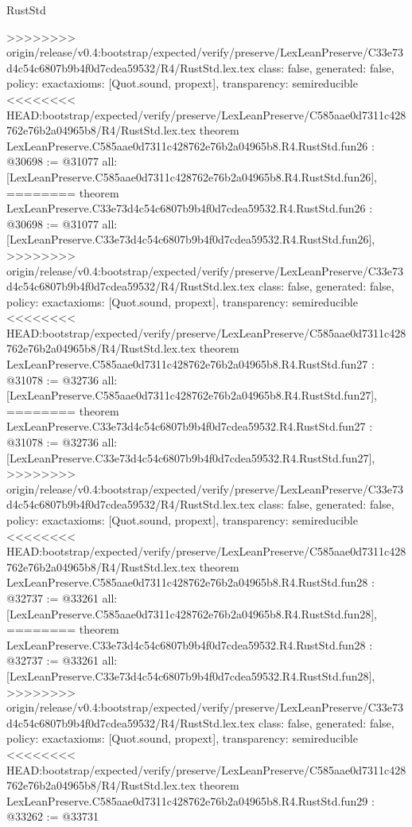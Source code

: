\begin{lexlean}{RustStd}
\begin{coremodule}
{\begin{coremodule}
{{{{{{{{{{{{{{{{{{{{{{{{{{{{{>>>>>>>> origin/release/v0.4:bootstrap/expected/verify/preserve/LexLeanPreserve/C33e73d4c54c6807b9b4f0d7cdea59532/R4/RustStd.lex.tex
  class: false,
  generated: false,
  policy: exact{axioms: [Quot.sound, propext]},
  transparency: semireducible
}
<<<<<<<< HEAD:bootstrap/expected/verify/preserve/LexLeanPreserve/C585aae0d7311c428762e76b2a04965b8/R4/RustStd.lex.tex
theorem LexLeanPreserve.C585aae0d7311c428762e76b2a04965b8.R4.RustStd.fun26 : @30698 := @31077 {
  all: [LexLeanPreserve.C585aae0d7311c428762e76b2a04965b8.R4.RustStd.fun26],
========
theorem LexLeanPreserve.C33e73d4c54c6807b9b4f0d7cdea59532.R4.RustStd.fun26 : @30698 := @31077 {
  all: [LexLeanPreserve.C33e73d4c54c6807b9b4f0d7cdea59532.R4.RustStd.fun26],
>>>>>>>> origin/release/v0.4:bootstrap/expected/verify/preserve/LexLeanPreserve/C33e73d4c54c6807b9b4f0d7cdea59532/R4/RustStd.lex.tex
  class: false,
  generated: false,
  policy: exact{axioms: [Quot.sound, propext]},
  transparency: semireducible
}
<<<<<<<< HEAD:bootstrap/expected/verify/preserve/LexLeanPreserve/C585aae0d7311c428762e76b2a04965b8/R4/RustStd.lex.tex
theorem LexLeanPreserve.C585aae0d7311c428762e76b2a04965b8.R4.RustStd.fun27 : @31078 := @32736 {
  all: [LexLeanPreserve.C585aae0d7311c428762e76b2a04965b8.R4.RustStd.fun27],
========
theorem LexLeanPreserve.C33e73d4c54c6807b9b4f0d7cdea59532.R4.RustStd.fun27 : @31078 := @32736 {
  all: [LexLeanPreserve.C33e73d4c54c6807b9b4f0d7cdea59532.R4.RustStd.fun27],
>>>>>>>> origin/release/v0.4:bootstrap/expected/verify/preserve/LexLeanPreserve/C33e73d4c54c6807b9b4f0d7cdea59532/R4/RustStd.lex.tex
  class: false,
  generated: false,
  policy: exact{axioms: [Quot.sound, propext]},
  transparency: semireducible
}
<<<<<<<< HEAD:bootstrap/expected/verify/preserve/LexLeanPreserve/C585aae0d7311c428762e76b2a04965b8/R4/RustStd.lex.tex
theorem LexLeanPreserve.C585aae0d7311c428762e76b2a04965b8.R4.RustStd.fun28 : @32737 := @33261 {
  all: [LexLeanPreserve.C585aae0d7311c428762e76b2a04965b8.R4.RustStd.fun28],
========
theorem LexLeanPreserve.C33e73d4c54c6807b9b4f0d7cdea59532.R4.RustStd.fun28 : @32737 := @33261 {
  all: [LexLeanPreserve.C33e73d4c54c6807b9b4f0d7cdea59532.R4.RustStd.fun28],
>>>>>>>> origin/release/v0.4:bootstrap/expected/verify/preserve/LexLeanPreserve/C33e73d4c54c6807b9b4f0d7cdea59532/R4/RustStd.lex.tex
  class: false,
  generated: false,
  policy: exact{axioms: [Quot.sound, propext]},
  transparency: semireducible
}
<<<<<<<< HEAD:bootstrap/expected/verify/preserve/LexLeanPreserve/C585aae0d7311c428762e76b2a04965b8/R4/RustStd.lex.tex
theorem LexLeanPreserve.C585aae0d7311c428762e76b2a04965b8.R4.RustStd.fun29 : @33262 := @33731 {
}}}}}}}}}}}}}}}}}}}}}}}}}}}}}}}}
\end{coremodule}}
\end{coremodule}
\end{lexlean}
